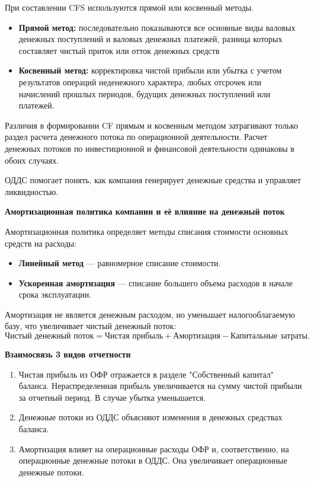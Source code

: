 При составлении CFS используются прямой или косвенный методы.

\begin{itemize}
    \item \textbf{Прямой метод:} последовательно показываются все основные виды валовых денежных поступлений и валовых денежных платежей, разница которых составляет чистый приток или отток денежных средств
    \item \textbf{Косвенный метод:} корректировка чистой прибыли или убытка с учетом результатов операций неденежного характера, любых отсрочек или начислений прошлых периодов, будущих денежных поступлений или платежей.
\end{itemize}

Различия в формировании CF прямым и косвенным методом затрагивают только раздел расчета денежного потока по операционной деятельности. Расчет денежных потоков по инвестиционной и финансовой деятельности одинаковы в обоих случаях.

ОДДС помогает понять, как компания генерирует денежные средства и управляет ликвидностью.

\textbf{Амортизационная политика компании и её влияние на денежный поток}

Амортизационная политика определяет методы списания стоимости основных средств на расходы:
\begin{itemize}
    \item \textbf{Линейный метод} --- равномерное списание стоимости.
    \item \textbf{Ускоренная амортизация} --- списание большего объема расходов в начале срока эксплуатации.
\end{itemize}
Амортизация не является денежным расходом, но уменьшает налогооблагаемую базу, что увеличивает чистый денежный поток:
\begin{equation}
    \text{Чистый денежный поток} = \text{Чистая прибыль} + \text{Амортизация} - \text{Капитальные затраты}.
\end{equation}

\textbf{Взаимосвязь 3 видов отчетности}

\begin{enumerate}
    \item Чистая прибыль из ОФР отражается в разделе "Собственный капитал" баланса. Нераспределенная прибыль увеличивается на сумму чистой прибыли за отчетный период. В случае убытка уменьшается.
    \item Денежные потоки из ОДДС объясняют изменения в денежных средствах баланса.
    \item Амортизация влияет на операционные расходы ОФР и, соответственно, на операционные денежные потоки в ОДДС. Она увеличивает операционные денежные потоки.
\end{enumerate}



